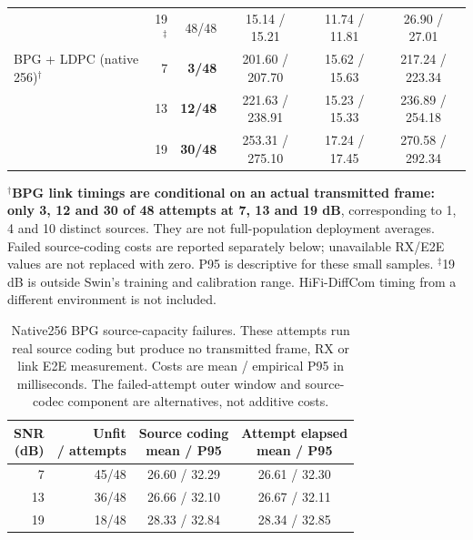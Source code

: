 \begin{table}[t]
\begin{tabular*}{\textwidth}{@{\extracolsep{\fill}}lrrccc@{}}
 & 19$^{\ddagger}$ & 48/48 & 15.14 / 15.21 & 11.74 / 11.81 & 26.90 / 27.01 \\
\addlinespace[2pt]
BPG + LDPC (native 256)$^{\dagger}$ & 7 & \textbf{3/48} & 201.60 / 207.70 & 15.62 / 15.63 & 217.24 / 223.34 \\
 & 13 & \textbf{12/48} & 221.63 / 238.91 & 15.23 / 15.33 & 236.89 / 254.18 \\
 & 19 & \textbf{30/48} & 253.31 / 275.10 & 17.24 / 17.45 & 270.58 / 292.34 \\
\bottomrule
\end{tabular*}
\par\vspace{2pt}
\begin{minipage}{\textwidth}\footnotesize
$^{\dagger}$\textbf{BPG link timings are conditional on an actual transmitted
frame: only 3, 12 and 30 of 48 attempts at 7, 13 and 19 dB}, corresponding to
1, 4 and 10 distinct sources. They are not full-population deployment averages.
Failed source-coding costs are reported separately below; unavailable RX/E2E
values are not replaced with zero. P95 is descriptive for these small samples.
$^{\ddagger}$19 dB is outside Swin's training and calibration range.
HiFi-DiffCom timing from a different environment is not included.
\end{minipage}
\end{table}

\begin{table}[t]
\centering
\caption{Native256 BPG source-capacity failures. These attempts run real source
coding but produce no transmitted frame, RX or link E2E measurement. Costs are
mean / empirical P95 in milliseconds. The failed-attempt outer window and
source-codec component are alternatives, not additive costs.}
\label{tab:bpg-source-unfit-cost}
\small
\setlength{\tabcolsep}{3pt}
\begin{tabular}{@{}rrcc@{}}
\toprule
\shortstack{SNR\\(dB)} & \shortstack{Unfit\\/ attempts} & \shortstack{Source coding\\mean / P95} & \shortstack{Attempt elapsed\\mean / P95} \\
\midrule
7 & 45/48 & 26.60 / 32.29 & 26.61 / 32.30 \\
13 & 36/48 & 26.66 / 32.10 & 26.67 / 32.11 \\
19 & 18/48 & 28.33 / 32.84 & 28.34 / 32.85 \\
\bottomrule
\end{tabular}
\end{table}

